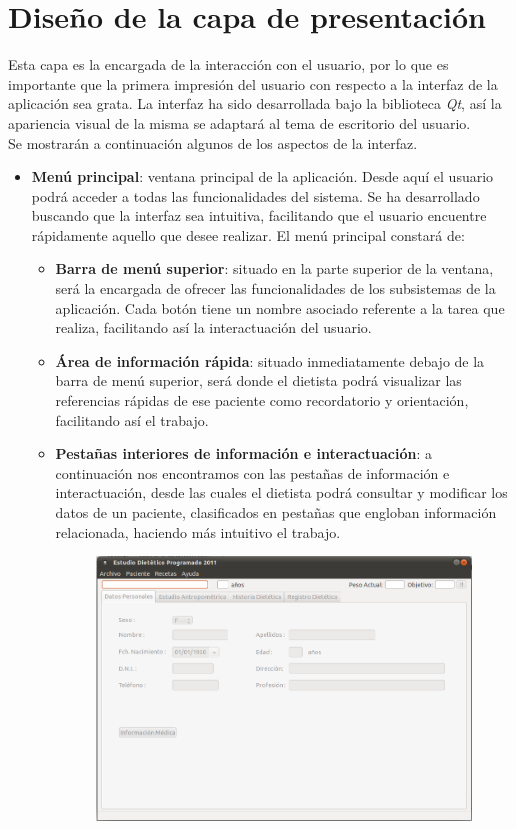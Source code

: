 \section{Diseño de la capa de presentación}
Esta capa es la encargada de la interacción con el usuario, por lo que es importante que la primera impresión del usuario con respecto a la interfaz de la aplicación sea grata. La interfaz ha sido desarrollada bajo la biblioteca \textit{Qt}, así la apariencia visual de la misma se adaptará al tema de escritorio del usuario.\\
Se mostrarán a continuación algunos de los aspectos de la interfaz.
\begin{itemize}
\item \textbf{Menú principal}: ventana principal de la aplicación. Desde aquí el usuario podrá acceder a todas las funcionalidades del sistema. Se ha desarrollado buscando que la interfaz sea intuitiva, facilitando que el usuario encuentre rápidamente aquello que desee realizar. El menú principal constará de:
\begin{itemize}
\item \textbf{Barra de menú superior}: situado en la parte superior de la ventana, será la encargada de ofrecer las funcionalidades de los subsistemas de la aplicación. Cada botón tiene un nombre asociado referente a la tarea que realiza, facilitando así la interactuación del usuario.
\item \textbf{Área de información rápida}: situado inmediatamente debajo de la barra de menú superior, será donde el dietista podrá visualizar las referencias rápidas de ese paciente como recordatorio y orientación, facilitando así el trabajo.
\item \textbf{Pestañas interiores de información e interactuación}: a continuación nos encontramos con las pestañas de información e interactuación, desde las cuales el dietista podrá consultar y modificar los datos de un paciente, clasificados en pestañas que engloban información relacionada, haciendo más intuitivo el trabajo.
\begin{figure}[H]
  \label{ppral}
  \begin{center}
    \includegraphics[scale=0.5]{../../Image/aplicacion.png}

\end{center}
\end{figure}
\end{itemize}
\end{itemize}

